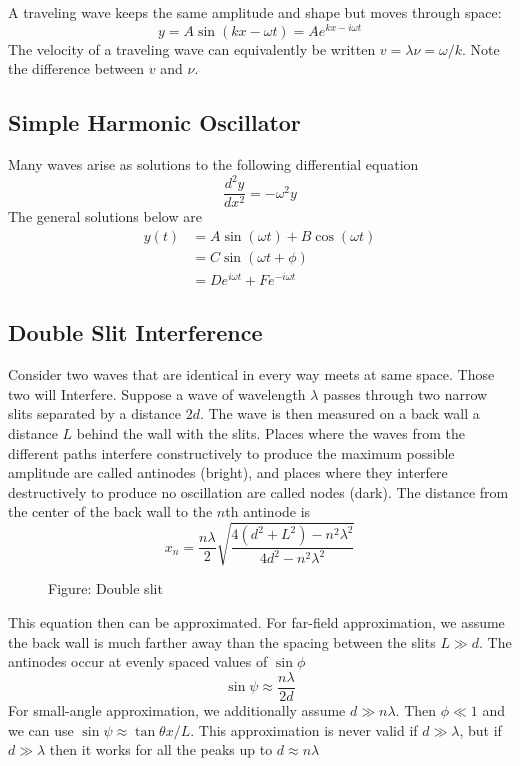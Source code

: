 \documentclass[../../../main.tex]{subfiles}
\begin{document}
A traveling wave keeps the same amplitude and shape but moves through space:
\begin{equation*}
    y=A\sin (kx-\omega t)=Ae^{kx-i\omega t}
\end{equation*}
The velocity of a traveling wave can equivalently be written $v =\lambda \nu=\omega /k$. Note the difference between $v$ and $\nu$.

\subsection{Simple Harmonic Oscillator}
Many waves arise as solutions to the following differential equation
\begin{equation*}
    \frac{d^2y}{dx^2}=-\omega^2y
\end{equation*}
The  general solutions below are 
\begin{align*}
    y(t)&=A \sin(\omega t) + B \cos(\omega t)\\
    &=C \sin(\omega t + \phi)\\
    &=De^{i\omega t} + Fe^{- i\omega t}
\end{align*}

\subsection{Double Slit Interference }
Consider two waves that are identical in every way meets at same space. Those two will Interfere. Suppose a wave of wavelength $\lambda$ passes through two narrow slits separated by a distance $2d$. The wave is then measured on a back wall a distance $L$ behind the wall with the slits. Places where the waves from the different paths interfere constructively to produce the maximum possible amplitude are called antinodes (bright), and places where they interfere destructively to produce no oscillation are called nodes (dark). The distance from the center of the back wall to the $n$th antinode is
\begin{equation*}
    x_n=\frac{n\lambda}{2}\sqrt{\frac{4 (d^2 + L^2) - n^2\lambda^2}{4d^2 - n^2\lambda^2}}
\end{equation*}
 \begin{figure}
    \centering
    \caption*{Figure: Double slit}
\end{figure}

This equation then can be approximated. For far-field approximation, we assume the back wall is much farther away than the spacing between the slits $L\gg d$. The antinodes occur at evenly spaced values of $\sin \phi$
\begin{equation*}
    \sin \psi \approx \frac{n\lambda}{2d}
\end{equation*}
For small-angle approximation, we additionally assume $d \gg n\lambda$. Then $\phi \ll 1$ and we can use $\sin \psi\approx \tan\theta x/L$. This approximation is never valid if $d \gg \lambda$, but if $d \gg \lambda$ then it works for all the peaks up to $d \approx n\lambda$
\end{document}
